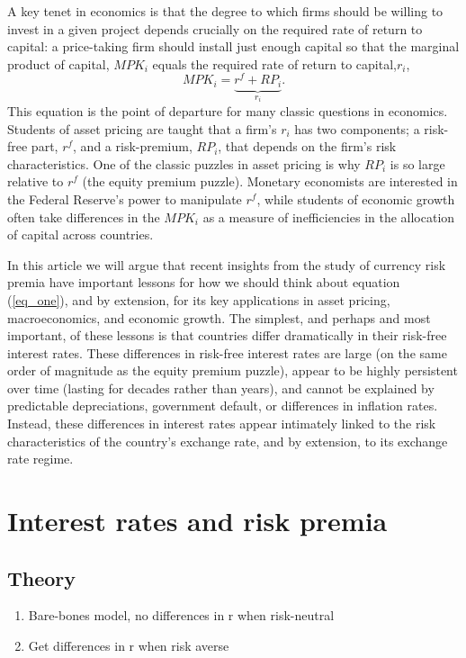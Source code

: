 \documentclass[12pt,letter]{article}
\theoremstyle{break} \theorembodyfont{\normalfont\itshape}
\theoremstyle{break}
\theoremstyle{break} \theorembodyfont{\normalfont\itshape}
\theoremstyle{break} \theorembodyfont{\normalfont\itshape}
\begin{document}
A key tenet in economics is that the degree to which firms should be
willing to invest in a given project depends crucially on the required
rate of return to capital: a price-taking firm should install just
enough capital so that the marginal product of capital, $MPK_i$ equals
the required rate of return to
capital,$r_i$, \begin{equation}MPK_i=\underbrace{r^f+RP_i}_{
    r_i}.\label{eq_one}\end{equation} This equation is the point of
departure for many classic questions in economics. Students of asset
pricing are taught that a firm's $r_i$ has two components; a risk-free
part, $r^f$, and a risk-premium, $RP_i$, that depends on the firm's
risk characteristics. One of the classic puzzles in asset pricing is
why $RP_i$ is so large relative to $r^f$ (the equity premium puzzle).
Monetary economists are interested in the Federal Reserve's power to
manipulate $r^f$, while students of economic growth often take
differences in the $MPK_i$ as a measure of inefficiencies in the
allocation of capital across countries.

In this article we will argue that recent insights from the study of
currency risk premia have important lessons for how we should think
about equation (\ref{eq_one}), and by extension, for its key
applications in asset pricing, macroeconomics, and economic growth.
The simplest, and perhaps and most important, of these lessons is that
countries differ dramatically in their risk-free interest rates. These
differences in risk-free interest rates are large (on the same order
of magnitude as the equity premium puzzle), appear to be highly
persistent over time (lasting for decades rather than years), and
cannot be explained by predictable depreciations, government default,
or differences in inflation rates. Instead, these differences in
interest rates appear intimately linked to the risk characteristics of
the country's exchange rate, and by extension, to its exchange rate
regime.



\section{Interest rates and risk premia}

\subsection{Theory}
\begin{enumerate}
\item Bare-bones model, no differences in r when risk-neutral
\item Get differences in r when risk averse
\end{enumerate}
\end{document}
